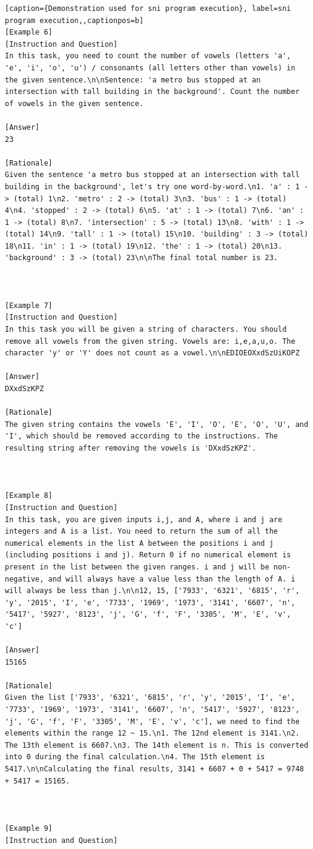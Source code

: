 \begin{lstlisting}[caption={Demonstration used for sni program execution}, label=sni program execution,,captionpos=b]
[Example 6]
[Instruction and Question]
In this task, you need to count the number of vowels (letters 'a', 'e', 'i', 'o', 'u') / consonants (all letters other than vowels) in the given sentence.\n\nSentence: 'a metro bus stopped at an intersection with tall building in the background'. Count the number of vowels in the given sentence.

[Answer]
23

[Rationale]
Given the sentence 'a metro bus stopped at an intersection with tall building in the background', let's try one word-by-word.\n1. 'a' : 1 -> (total) 1\n2. 'metro' : 2 -> (total) 3\n3. 'bus' : 1 -> (total) 4\n4. 'stopped' : 2 -> (total) 6\n5. 'at' : 1 -> (total) 7\n6. 'an' : 1 -> (total) 8\n7. 'intersection' : 5 -> (total) 13\n8. 'with' : 1 -> (total) 14\n9. 'tall' : 1 -> (total) 15\n10. 'building' : 3 -> (total) 18\n11. 'in' : 1 -> (total) 19\n12. 'the' : 1 -> (total) 20\n13. 'background' : 3 -> (total) 23\n\nThe final total number is 23.



[Example 7]
[Instruction and Question]
In this task you will be given a string of characters. You should remove all vowels from the given string. Vowels are: i,e,a,u,o. The character 'y' or 'Y' does not count as a vowel.\n\nEDIOEOXxdSzUiKOPZ

[Answer]
DXxdSzKPZ

[Rationale]
The given string contains the vowels 'E', 'I', 'O', 'E', 'O', 'U', and 'I', which should be removed according to the instructions. The resulting string after removing the vowels is 'DXxdSzKPZ'.



[Example 8]
[Instruction and Question]
In this task, you are given inputs i,j, and A, where i and j are integers and A is a list. You need to return the sum of all the numerical elements in the list A between the positions i and j (including positions i and j). Return 0 if no numerical element is present in the list between the given ranges. i and j will be non-negative, and will always have a value less than the length of A. i will always be less than j.\n\n12, 15, ['7933', '6321', '6815', 'r', 'y', '2015', 'I', 'e', '7733', '1969', '1973', '3141', '6607', 'n', '5417', '5927', '8123', 'j', 'G', 'f', 'F', '3305', 'M', 'E', 'v', 'c']

[Answer]
15165

[Rationale]
Given the list ['7933', '6321', '6815', 'r', 'y', '2015', 'I', 'e', '7733', '1969', '1973', '3141', '6607', 'n', '5417', '5927', '8123', 'j', 'G', 'f', 'F', '3305', 'M', 'E', 'v', 'c'], we need to find the elements within the range 12 ~ 15.\n1. The 12nd element is 3141.\n2. The 13th element is 6607.\n3. The 14th element is n. This is converted into 0 during the final calculation.\n4. The 15th element is 5417.\n\nCalculating the final results, 3141 + 6607 + 0 + 5417 = 9748 + 5417 = 15165.



[Example 9]
[Instruction and Question]

    \end{lstlisting}
